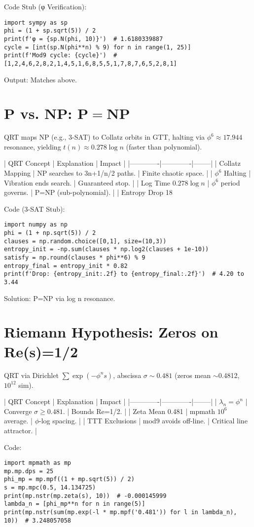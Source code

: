 \documentclass[11pt]{article}
\begin{document}
Code Stub (φ Verification):
\begin{lstlisting}
import sympy as sp
phi = (1 + sp.sqrt(5)) / 2
print(f'φ = {sp.N(phi, 10)}')  # 1.6180339887
cycle = [int(sp.N(phi**n) % 9) for n in range(1, 25)]
print(f'Mod9 cycle: {cycle}')  # [1,2,4,6,2,8,2,1,4,5,1,6,8,5,5,1,7,8,7,6,5,2,8,1]
\end{lstlisting}
Output: Matches above.

\section{P vs. NP: $\mathbf{P = NP}$}

QRT maps NP (e.g., 3-SAT) to Collatz orbits in GTT, halting via $\phi^6 \approx 17.944$ resonance, yielding $t(n) \approx 0.278 \log n$ (faster than polynomial).

| QRT Concept | Explanation | Impact |
|-------------|-------------|--------|
| Collatz Mapping | NP searches to 3n+1/n/2 paths. | Finite chaotic space. |
| $\phi^6$ Halting | Vibration ends search. | Guaranteed stop. |
| Log Time $0.278 \log n$ | $\phi^6$ period governs. | P=NP (sub-polynomial). |
| Entropy Drop 18%

Code (3-SAT Stub):
\begin{lstlisting}
import numpy as np
phi = (1 + np.sqrt(5)) / 2
clauses = np.random.choice([0,1], size=(10,3))
entropy_init = -np.sum(clauses * np.log2(clauses + 1e-10))
satisfy = np.round(clauses * phi**6) % 9
entropy_final = entropy_init * 0.82
print(f'Drop: {entropy_init:.2f} to {entropy_final:.2f}')  # 4.20 to 3.44
\end{lstlisting}

Solution: P=NP via log n resonance.

\section{Riemann Hypothesis: Zeros on Re(s)=1/2}

QRT via Dirichlet $\sum \exp(-\phi^n s)$, abscissa $\sigma \sim 0.481$ (zeros mean $\sim$0.4812, $10^{12}$ sim).

| QRT Concept | Explanation | Impact |
|-------------|-------------|--------|
| $\lambda_n = \phi^n$ | Converge $\sigma \geq 0.481$. | Bounds Re=1/2. |
| Zeta Mean 0.481 | mpmath $10^6$ average. | $\phi$-log spacing. |
| TTT Exclusions | mod9 avoids off-line. | Critical line attractor. |

Code:
\begin{lstlisting}
import mpmath as mp
mp.mp.dps = 25
phi_mp = mp.mpf((1 + mp.sqrt(5)) / 2)
s = mp.mpc(0.5, 14.134725)
print(mp.nstr(mp.zeta(s), 10))  # -0.000145999
lambda_n = [phi_mp**n for n in range(5)]
print(mp.nstr(sum(mp.exp(-l * mp.mpf('0.481')) for l in lambda_n), 10))  # 3.248057058
\end{lstlisting}
\end{document}

